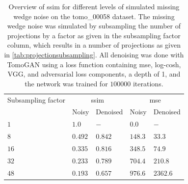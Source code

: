 \begin{table}[htbp]
  \centering
  \caption[SSIM for different levels of simulated missing wedge noise and corresponding values after denoising]{Overview of \acrshort{ssim} for different levels of simulated missing wedge noise on the tomo\_00058 dataset. The missing wedge noise was simulated by subsampling the number of projections by a factor as given in the subsampling factor column, which results in a number of projections as given in \cref{tab:projectionsubsampling}. All denoising was done with TomoGAN using a loss function containing \acrshort{mse}, log-cosh, VGG, and adversarial loss components, a depth of 1, and the network was trained for $100 000$ iterations. }
  \label{tab:missingwedgessim2}
  \begin{tabular}{lllll}
  \hline
  Subsampling factor & \multicolumn{2}{c}{\acrshort{ssim}} & \multicolumn{2}{c}{\acrshort{mse}}  \\
  \hhline{=====}
  {} & Noisy & Denoised & Noisy & Denoised \\
  \hline 
  $1$  & $1.0$ & $-$ & $0.0$ & $-$ \\
  $8$  & $0.492$ & $0.842$ & $148.3$ & $33.3$ \\
  $16$ & $0.335$ & $0.816$ & $348.5$ & $74.9$ \\
  $32$ & $0.233$ & $0.789$ & $704.4$ & $210.8$ \\
  $48$ & $0.193$ & $0.657$ & $976.6$ & $2362.6$ \\
  \hline
  \end{tabular}
\end{table}

